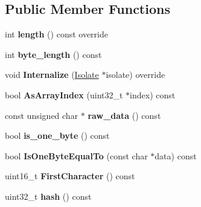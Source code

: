 \subsection*{Public Member Functions}
\begin{DoxyCompactItemize}
\item 
int {\bfseries length} () const  override\hypertarget{classv8_1_1internal_1_1_ast_raw_string_a8cc26a55a46fde01b0706d7df862c769}{}\label{classv8_1_1internal_1_1_ast_raw_string_a8cc26a55a46fde01b0706d7df862c769}

\item 
int {\bfseries byte\+\_\+length} () const \hypertarget{classv8_1_1internal_1_1_ast_raw_string_aa29268cb3dbda013c098e48e5fbd595d}{}\label{classv8_1_1internal_1_1_ast_raw_string_aa29268cb3dbda013c098e48e5fbd595d}

\item 
void {\bfseries Internalize} (\hyperlink{classv8_1_1internal_1_1_isolate}{Isolate} $\ast$isolate) override\hypertarget{classv8_1_1internal_1_1_ast_raw_string_aad50b9678b44ece2774a3971ec9ddb37}{}\label{classv8_1_1internal_1_1_ast_raw_string_aad50b9678b44ece2774a3971ec9ddb37}

\item 
bool {\bfseries As\+Array\+Index} (uint32\+\_\+t $\ast$index) const \hypertarget{classv8_1_1internal_1_1_ast_raw_string_a3d50a9463da53958aad96da0729eda13}{}\label{classv8_1_1internal_1_1_ast_raw_string_a3d50a9463da53958aad96da0729eda13}

\item 
const unsigned char $\ast$ {\bfseries raw\+\_\+data} () const \hypertarget{classv8_1_1internal_1_1_ast_raw_string_a19b4f332aee9c58ebccf9130576828f0}{}\label{classv8_1_1internal_1_1_ast_raw_string_a19b4f332aee9c58ebccf9130576828f0}

\item 
bool {\bfseries is\+\_\+one\+\_\+byte} () const \hypertarget{classv8_1_1internal_1_1_ast_raw_string_af8f3bf741a731825048c0ade6dfc4b14}{}\label{classv8_1_1internal_1_1_ast_raw_string_af8f3bf741a731825048c0ade6dfc4b14}

\item 
bool {\bfseries Is\+One\+Byte\+Equal\+To} (const char $\ast$data) const \hypertarget{classv8_1_1internal_1_1_ast_raw_string_a447f234bce2635272c0ce6e3d65247d0}{}\label{classv8_1_1internal_1_1_ast_raw_string_a447f234bce2635272c0ce6e3d65247d0}

\item 
uint16\+\_\+t {\bfseries First\+Character} () const \hypertarget{classv8_1_1internal_1_1_ast_raw_string_a913e377b7afff07dc27fbd81932a2cb4}{}\label{classv8_1_1internal_1_1_ast_raw_string_a913e377b7afff07dc27fbd81932a2cb4}

\item 
uint32\+\_\+t {\bfseries hash} () const \hypertarget{classv8_1_1internal_1_1_ast_raw_string_a0e285ff9f228e2cb92cda7dc2461e2de}{}\label{classv8_1_1internal_1_1_ast_raw_string_a0e285ff9f228e2cb92cda7dc2461e2de}

\end{DoxyCompactItemize}
